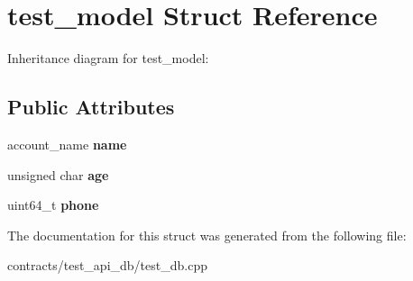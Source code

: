 \hypertarget{structtest__model}{}\section{test\+\_\+model Struct Reference}
\label{structtest__model}


Inheritance diagram for test\+\_\+model\+:
\subsection*{Public Attributes}
\begin{DoxyCompactItemize}
\item 
\mbox{\label{structtest__model_aa94809b8de753b3514062ea51bb1afef}} 
account\+\_\+name {\bfseries name}
\item 
\mbox{\label{structtest__model_ad6c2d0fb30e34ab544f66092931b73f9}} 
unsigned char {\bfseries age}
\item 
\mbox{\label{structtest__model_aef24416a78161629f1f7348029efa630}} 
uint64\+\_\+t {\bfseries phone}
\end{DoxyCompactItemize}


The documentation for this struct was generated from the following file\+:\begin{DoxyCompactItemize}
\item 
contracts/test\+\_\+api\+\_\+db/test\+\_\+db.\+cpp\end{DoxyCompactItemize}
